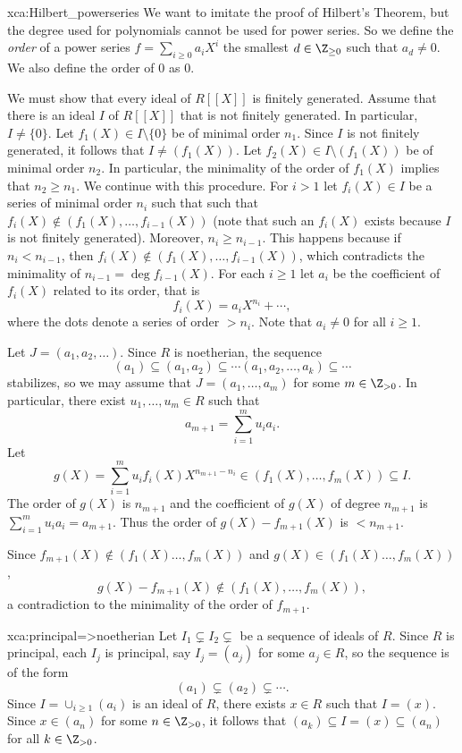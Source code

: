 \begin{sol}{xca:Hilbert_powerseries}
    We want to imitate the proof of Hilbert's Theorem, but the degree used for polynomials cannot be used for power series.
    So we define the \emph{order} of a power series 
    $f=\sum_{i\geq 0}a_iX^i$ the smallest $d\in \Z_{\geq 0}$ such that $a_d\neq 0$. We also define the order of 0 as 0.
    
    We must show that every ideal of $R[\![X]\!]$ is finitely generated.
    Assume that
	there is an ideal $I$ of $R[\![X]\!]$ that is not finitely generated. In particular, $I\ne\{0\}$.
	Let $f_1(X)\in I\setminus\{0\}$ be of minimal order $n_1$. 
	Since $I$ is not finitely generated, it follows that 
	$I\ne (f_1(X))$. Let $f_2(X)\in I\setminus (f_1(X))$ be
	of minimal order $n_2$.
    In particular, the minimality of the order of $f_1(X)$ implies that 
	$n_2\geq n_1$. 
	We continue with this procedure. For $i>1$ let 
	$f_i(X)\in I$ be a series of minimal order $n_i$ such that  
	such that $f_i(X)\not\in(f_1(X),\dots,f_{i-1}(X))$ (note
	that such an $f_i(X)$ exists because $I$ is not finitely generated). 
	Moreover, $n_i\geq n_{i-1}$. This happens because 
	if $n_i<n_{i-1}$, then
	$f_i(X)\not\in (f_1(X),\dots,f_{i-1}(X))$, which contradicts
	the minimality of $n_{i-1}=\deg f_{i-1}(X)$. 
	For each $i\geq1$ 
	let $a_i$ be the coefficient of $f_i(X)$ 
    related to its order, that is
	\[
	f_i(X)=a_iX^{n_i}+\cdots,
	\]
	where the dots denote a series of 
	order $>n_i$. Note that 
	$a_i\ne 0$ for all $i\geq 1$. 
	
	Let $J=(a_1,a_2,\dots)$. Since $R$ is noetherian, the sequence
	\[
	(a_1)\subseteq (a_1,a_2)\subseteq\cdots(a_1,a_2,\dots,a_k)\subseteq\cdots
	\]
	stabilizes, so we may assume that 
	$J=(a_1,\dots,a_m)$ for some $m\in\Z_{>0}$. 
	In particular, there exist $u_1,\dots,u_m\in R$ such that 
	\[
	a_{m+1}=\sum_{i=1}^m u_ia_i.
	\]
	Let 
	\[
	g(X)=\sum_{i=1}^mu_if_i(X)X^{n_{m+1}-n_i}\in (f_1(X),\dots,f_m(X))\subseteq I.
	\]
    The order of $g(X)$ is $n_{m+1}$ and the coefficient of $g(X)$ of degree $n_{m+1}$ is $\sum_{i=1}^mu_ia_i=a_{m+1}$.
    Thus the order of $g(X)-f_{m+1}(X)$ is $<n_{m+1}$. 
	
	Since $f_{m+1}(X)\not\in (f_1(X)\dots,f_m(X))$ and $g(X)\in (f_1(X)\dots,f_m(X))$, 
	\[
	g(X)-f_{m+1}(X)\not\in (f_1(X),\dots,f_m(X)),
	\]
	a contradiction to the minimality of the order of $f_{m+1}$.  
\end{sol}

\begin{sol}{xca:principal=>noetherian}
	Let $I_1\subsetneq I_2\subsetneq$ be a sequence of ideals of $R$.  
	Since $R$ is principal, each $I_j$ is principal, 
	say $I_j=(a_j)$ for some $a_j\in R$, so the sequence is of the form
	\[
	(a_1)\subsetneq (a_2)\subsetneq\cdots.
	\]
	Since $I=\cup_{i\geq1}(a_i)$ is an ideal of $R$, 
	there exists $x\in R$ such that $I=(x)$. Since $x\in (a_n)$ for some $n\in\Z_{>0}$, 
	it follows that $(a_k)\subseteq I=(x)\subseteq (a_n)$ for all $k\in\Z_{>0}$. 
\end{sol}

